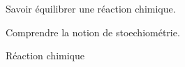 \sndEnTeteSix

\vspace*{-40pt}

\begin{objectifs}
  \item Savoir équilibrer une réaction chimique.
  \item Comprendre la notion de stoechiométrie.
\end{objectifs}

\begin{contexte}
  
  \problematique{
  }
\end{contexte}


\begin{doc}{Réaction chimique}
  \vspace*{-22pt}
  \begin{encart}

  \end{encart}

\end{doc}


